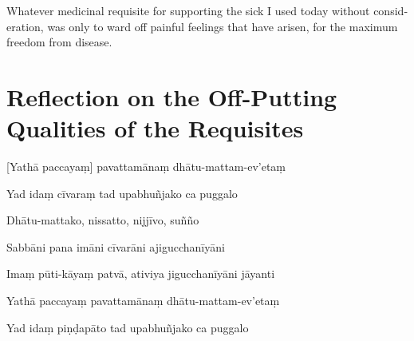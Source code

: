 \begin{english}
  Whatever medicinal requisite for supporting the sick I used today without
  consideration, was only to ward off painful feelings that have arisen, for the
  maximum freedom from disease.\\
\end{english}

\section[Reflection on the Off-Putting Qualities]{Reflection on the Off-Putting Qualities of the Requisites}



\begin{leader}
\end{leader}


[Yathā paccayaṃ] pavattamānaṃ dhātu-mattam-ev'etaṃ


Yad idaṃ cīvaraṃ tad upabhuñjako ca puggalo


Dhātu-mattako, nissatto, nijjīvo, suñño


Sabbāni pana imāni cīvarāni ajigucchanīyāni


Imaṃ pūti-kāyaṃ patvā, ativiya jigucchanīyāni jāyanti


Yathā paccayaṃ pavattamānaṃ dhātu-mattam-ev'etaṃ


Yad idaṃ piṇḍapāto tad upabhuñjako ca puggalo

